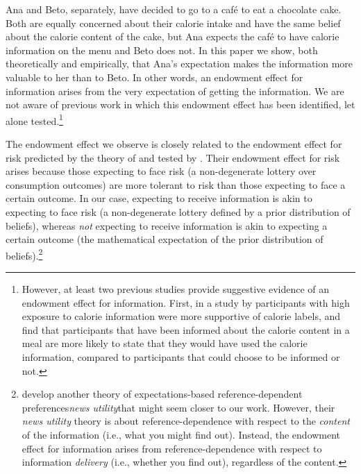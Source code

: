 
Ana and Beto, separately, have decided to go to a café to eat a chocolate cake. Both are equally concerned about their calorie intake and have the same belief about the calorie content of the cake, but Ana expects the café to have calorie information on the menu and Beto does not. In this paper we show, both theoretically and empirically, that Ana’s expectation makes the information more valuable to her than to Beto.  In other words, an endowment effect for information arises from the very expectation of getting the information. We are not aware of previous work in which this endowment effect has been identified, let alone tested.\footnote{However, at least two previous studies provide suggestive evidence of an endowment effect for information. First, in a study by \citet{cawleyImpactInformationDisclosure2020} participants with high exposure to calorie information were more supportive of calorie labels, and \cite{nordstromStrategicIgnoranceHealth2020} find that participants that have been informed about the calorie content in a meal are more likely to state that they would have used the calorie information, compared to participants that could choose to be informed or not.}


The endowment effect we observe is closely related to the endowment effect for risk predicted by the theory of \citet{koszegiReferenceDependentRiskAttitudes2007} and tested by \citet{sprengerEndowmentEffectRisk2015}. Their endowment effect for risk arises because those expecting to face risk (a non-degenerate lottery over consumption outcomes) are more tolerant to risk than those expecting to face a certain outcome. In our case, expecting to receive information is akin to expecting to face risk (a non-degenerate lottery defined by a prior distribution of beliefs), whereas \emph{not} expecting to receive information is akin to expecting a certain outcome (the mathematical expectation of the prior distribution of beliefs).\footnote{\citet{koszegiReferenceDependentConsumptionPlans2009} develop another theory of expectations-based reference-dependent preferences\textemdash\emph{news utility}\textemdash that might seem closer to our work. However, their \emph{news utility} theory is about reference-dependence with respect to the \emph{content} of the information (i.e., what you might find out). Instead, the endowment effect for information arises from reference-dependence with respect to information \emph{delivery} (i.e., whether you find out), regardless of the content.}

